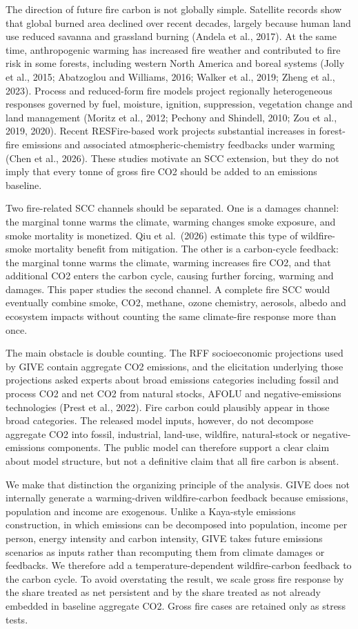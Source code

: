 \documentclass[12pt]{article}
\begin{document}
The direction of future fire carbon is not globally simple. Satellite
records show that global burned area declined over recent decades,
largely because human land use reduced savanna and grassland burning
(Andela et al., 2017). At the same time, anthropogenic warming has
increased fire weather and contributed to fire risk in some forests,
including western North America and boreal systems (Jolly et al., 2015;
Abatzoglou and Williams, 2016; Walker et al., 2019; Zheng et al., 2023).
Process and reduced-form fire models project regionally heterogeneous
responses governed by fuel, moisture, ignition, suppression, vegetation
change and land management (Moritz et al., 2012; Pechony and Shindell,
2010; Zou et al., 2019, 2020). Recent RESFire-based work projects
substantial increases in forest-fire emissions and associated
atmospheric-chemistry feedbacks under warming (Chen et al., 2026). These
studies motivate an SCC extension, but they do not imply that every
tonne of gross fire CO2 should be added to an emissions baseline.

Two fire-related SCC channels should be separated. One is a damages
channel: the marginal tonne warms the climate, warming changes smoke
exposure, and smoke mortality is monetized. Qiu et al.~(2026) estimate
this type of wildfire-smoke mortality benefit from mitigation. The other
is a carbon-cycle feedback: the marginal tonne warms the climate,
warming increases fire CO2, and that additional CO2 enters the carbon
cycle, causing further forcing, warming and damages. This paper studies
the second channel. A complete fire SCC would eventually combine smoke,
CO2, methane, ozone chemistry, aerosols, albedo and ecosystem impacts
without counting the same climate-fire response more than once.

The main obstacle is double counting. The RFF socioeconomic projections
used by GIVE contain aggregate CO2 emissions, and the elicitation
underlying those projections asked experts about broad emissions
categories including fossil and process CO2 and net CO2 from natural
stocks, AFOLU and negative-emissions technologies (Prest et al., 2022).
Fire carbon could plausibly appear in those broad categories. The
released model inputs, however, do not decompose aggregate CO2 into
fossil, industrial, land-use, wildfire, natural-stock or
negative-emissions components. The public model can therefore support a
clear claim about model structure, but not a definitive claim that all
fire carbon is absent.

We make that distinction the organizing principle of the analysis. GIVE
does not internally generate a warming-driven wildfire-carbon feedback
because emissions, population and income are exogenous. Unlike a
Kaya-style emissions construction, in which emissions can be decomposed
into population, income per person, energy intensity and carbon
intensity, GIVE takes future emissions scenarios as inputs rather than
recomputing them from climate damages or feedbacks. We therefore add a
temperature-dependent wildfire-carbon feedback to the carbon cycle. To
avoid overstating the result, we scale gross fire response by the share
treated as net persistent and by the share treated as not already
embedded in baseline aggregate CO2. Gross fire cases are retained only
as stress tests.
\end{document}
